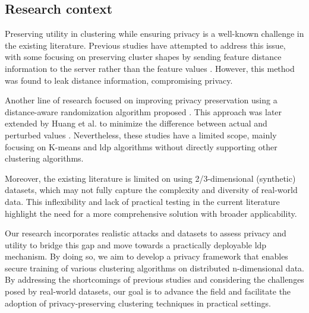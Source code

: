 \newpage

\subsection*{Research context}
Preserving utility in clustering while ensuring privacy is a well-known challenge in the existing literature.
Previous studies have attempted to address this issue, with some focusing on preserving cluster shapes by sending feature distance information to the server rather than the feature values \citep{sun_distributed_2019}.
However, this method was found to leak distance information, compromising privacy.

Another line of research focused on improving privacy preservation using a distance-aware randomization algorithm proposed \citep{xia_distributed_2020}.
This approach was later extended by Huang et al. to minimize the difference between actual and perturbed values \citep{9679364}.
Nevertheless, these studies have a limited scope, mainly focusing on K-means and \gls{ldp} algorithms without directly supporting other clustering algorithms.

Moreover, the existing literature is limited on using 2/3-dimensional (synthetic) datasets, which may not fully capture the complexity and diversity of real-world data.
This inflexibility and lack of practical testing in the current literature highlight the need for a more comprehensive solution with broader applicability.

Our research incorporates realistic attacks and datasets to assess privacy and utility to bridge this gap and move towards a practically deployable \gls{ldp} mechanism.
By doing so, we aim to develop a privacy framework that enables secure training of various clustering algorithms on distributed n-dimensional data.
By addressing the shortcomings of previous studies and considering the challenges posed by real-world datasets, our goal is to advance the field and facilitate the adoption of privacy-preserving clustering techniques in practical settings.

